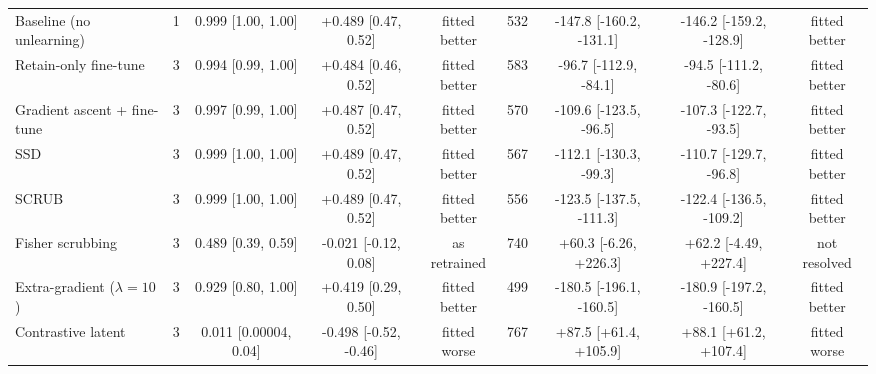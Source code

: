 \begin{tabular}{lcccccccc}
Baseline (no unlearning) & 1 & 0.999 [1.00, 1.00] & +0.489 [0.47, 0.52] & fitted better & 532 & -147.8 [-160.2, -131.1] & -146.2 [-159.2, -128.9] & fitted better \\
Retain-only fine-tune & 3 & 0.994 [0.99, 1.00] & +0.484 [0.46, 0.52] & fitted better & 583 & -96.7 [-112.9, -84.1] & -94.5 [-111.2, -80.6] & fitted better \\
Gradient ascent + fine-tune & 3 & 0.997 [0.99, 1.00] & +0.487 [0.47, 0.52] & fitted better & 570 & -109.6 [-123.5, -96.5] & -107.3 [-122.7, -93.5] & fitted better \\
SSD & 3 & 0.999 [1.00, 1.00] & +0.489 [0.47, 0.52] & fitted better & 567 & -112.1 [-130.3, -99.3] & -110.7 [-129.7, -96.8] & fitted better \\
SCRUB & 3 & 0.999 [1.00, 1.00] & +0.489 [0.47, 0.52] & fitted better & 556 & -123.5 [-137.5, -111.3] & -122.4 [-136.5, -109.2] & fitted better \\
Fisher scrubbing & 3 & 0.489 [0.39, 0.59] & -0.021 [-0.12, 0.08] & as retrained & 740 & +60.3 [-6.26, +226.3] & +62.2 [-4.49, +227.4] & not resolved \\
Extra-gradient ($\lambda=10$) & 3 & 0.929 [0.80, 1.00] & +0.419 [0.29, 0.50] & fitted better & 499 & -180.5 [-196.1, -160.5] & -180.9 [-197.2, -160.5] & fitted better \\
Contrastive latent & 3 & 0.011 [0.00004, 0.04] & -0.498 [-0.52, -0.46] & fitted worse & 767 & +87.5 [+61.4, +105.9] & +88.1 [+61.2, +107.4] & fitted worse \\
\bottomrule
\end{tabular}
